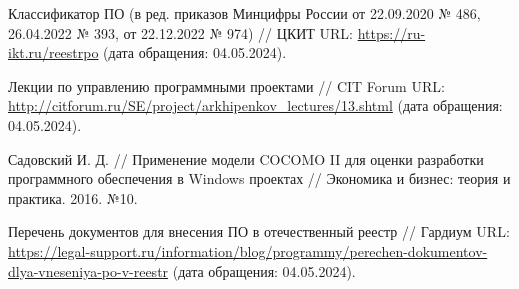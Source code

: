 \begin{thebibliography}{99\kern\bibindent}
	\begin{comment}
	\bibitem{bib:func_and_nf_req} Самое полное руководство по управлению требованиями и отслеживаемости // Visure Solutions URL: \url{https://visuresolutions.com/ru/requirements-management-traceability-guide/functional-vs-non-functional-requirements} (дата обращения: 07.04.2024).

	\bibitem{bib:app_req} Определение требований к программному обеспечению  // Narod.ru URL: \url{https://chaox-dump.narod.ru/ooap/ooapl6.html} (дата обращения: 07.04.2024).

	\bibitem{bib:152fz} Федеральный закон от 27.07.2006 г. № 152-ФЗ // Kremlin.ru URL: \url{http://kremlin.ru/acts/bank/24154} (дата обращения: 07.04.2024).
	
	\bibitem{bib:sc_abi} Финогеев А. Г., Васин С. М., Гамидуллаева Л. А., Финогеев А. А. // Технология смарт контрактов на основе блокчейн для минимизации трансакционных издержек в региональных инновационных системах // Вопросы безопасности. 2018. №3: 46-48. %

	\bibitem{bib:ipfs_is} IPFS вместо HTTP — будущее децентрализованного интернета // ForkLog URL: \url{https://forklog.com/cryptorium/chto-takoe-ipfs} (дата обращения: 07.04.2024).
	\end{comment}

	 Классификатор ПО (в ред. приказов Минцифры России от 22.09.2020 № 486, 26.04.2022 № 393, от 22.12.2022 № 974) // ЦКИТ URL: \url{https://ru-ikt.ru/reestrpo} (дата обращения: 04.05.2024).

	 Лекции по управлению программными проектами // CIT Forum URL: \url{http://citforum.ru/SE/project/arkhipenkov_lectures/13.shtml} (дата обращения: 04.05.2024).

	 Садовский И. Д. // Применение модели COCOMO II для оценки разработки программного обеспечения в Windows проектах // Экономика и бизнес: теория и практика. 2016. №10. %

	 Перечень документов для внесения ПО в отечественный реестр // Гардиум URL: \url{https://legal-support.ru/information/blog/programmy/perechen-dokumentov-dlya-vneseniya-po-v-reestr} (дата обращения: 04.05.2024).


\end{thebibliography}
